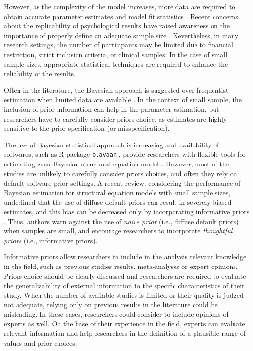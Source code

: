 \documentclass[graybox]{svmult}
\begin{document}
However, as the complexity of the model increases, more data are required to obtain accurate parameter estimates and model fit statistics \cite{wolfSampleSizeRequirements2013}. Recent concerns about the replicability of psychological results have raised awareness on the importance of properly define an adequate sample size \cite{ioannidisWhyMostPublished2005, opensciencecollaborationEstimatingReproducibilityPsychological2015}.  Nevertheless, in many research settings, the number of participants may be limited due to financial restriction, strict inclusion criteria, or clinical samples. In the case of small sample sizes, appropriate statistical techniques are required to enhance the reliability of the results.

Often in the literature, the Bayesian approach is suggested over frequentist estimation when limited data are available \cite{mcneishUsingBayesianMethods2016a}.  In the context of small sample, the inclusion of prior information can help in the parameter estimation, but researchers have to carefully consider priors choice, as estimates are highly sensitive to the prior specification (or misspecification).

The use of Bayesian statistical approach is increasing and availability of softwares, such as R-package \texttt{blavaan} \cite{merkleBlavaanBayesianStructural2018},  provide researchers with flexible tools for estimating even Bayesian structural equation models. However, most of the studies are unlikely to carefully consider priors choices, and often they rely on default software prior settings. A recent review, considering the performance of Bayesian estimation for structural equation models with small sample sizes, underlined that the use of diffuse default priors can result in severely biased estimates, and this bias can be decreased only by incorporating informative priors \cite{smidBayesianFrequentistEstimation2020}. Thus, authors warn against the use of \emph{naive prior} (i.e., diffuse default priors) when samples are small, and encourage researchers to incorporate \emph{thoughtful priors} (i.e., informative priors).

Informative priors allow researchers to include in the analysis relevant knowledge in the field, such as previous studies results, meta-analyses or expert opinions. Priors choice should be clearly discussed and researchers are required to evaluate the generalizability of external information to the specific characteristics of their study. When the number of available studies is limited or their quality is judged not adequate, relying only on previous results in the literature could be misleading. In these cases, researchers could consider to include opinions of experts as well. On the base of their experience in the field, experts can evaluate relevant information and help researchers in the definition of a plausible range of values and prior choices.
\end{document}
